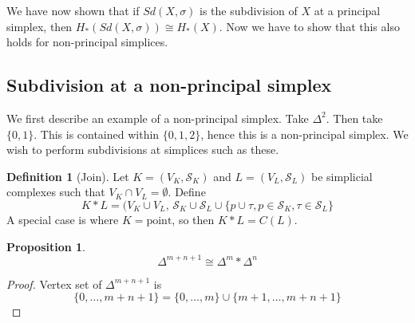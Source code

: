 \documentclass[a4paper,14pt]{extarticle}
\theoremstyle{definition}
\newtheorem*{definition}{Definition}
\newtheorem*{proposition}{Proposition}
\begin{document}
We have now shown that if $Sd(X,\sigma)$ is the subdivision of $X$ at a principal simplex,
then $H_*(Sd(X,\sigma))\cong H_*(X)$. Now we have to show that this also holds for
non-principal simplices.

\subsection{Subdivision at a non-principal simplex}
We first describe an example of a non-principal simplex. Take $\Delta^2$. Then take $\{0,1\}$.
This is contained within $\{0,1,2\}$, hence this is a non-principal simplex. We wish to 
perform subdivisions at simplices such as these.
\begin{definition}[Join]
	Let $K=(V_K,\mathcal{S}_K)$ and $L=(V_L,\mathcal{S}_L)$ be simplicial complexes such that
	$V_K\cap V_L=\emptyset$. Define 
	\[K*L=(V_K\cup V_L, \,\mathcal{S}_K\cup\mathcal{S}_L\cup\{p\cup\tau, p\in\mathcal{S}_K,\tau\in\mathcal{S}_L\}\]
	A special case is where $K=\text{point}$, so then $K*L=C(L)$.
\end{definition}

\begin{proposition}
	\[\Delta^{m+n+1}\cong\Delta^m*\Delta^n\]
\end{proposition}

\begin{proof}
	Vertex set of $\Delta^{m+n+1}$ is \[\{0,\ldots,m+n+1\}=\{0,\ldots,m\}\cup\{m+1,\ldots,m+n+1\}\]
\end{proof}
\end{document}
